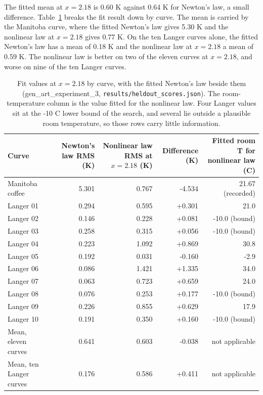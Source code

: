 \documentclass[11pt,letterpaper]{article}
\begin{document}
The fitted mean at $x = 2.18$ is 0.60 K against 0.64 K for Newton's law, a small difference. Table~\ref{tab:it2-fitcurve} breaks the fit result down by curve. The mean is carried by the Manitoba curve, where the fitted Newton's law gives 5.30 K and the nonlinear law at $x = 2.18$ gives 0.77 K. On the ten Langer curves alone, the fitted Newton's law has a mean of 0.18 K and the nonlinear law at $x = 2.18$ a mean of 0.59 K. The nonlinear law is better on two of the eleven curves at $x = 2.18$, and worse on nine of the ten Langer curves.

\begin{table}[!htbp]
\centering
\small
\caption{Fit values at $x = 2.18$ by curve, with the fitted Newton's law beside them (gen\_art\_experiment\_3, \texttt{results/heldout\_scores.json}). The room-temperature column is the value fitted for the nonlinear law. Four Langer values sit at the -10 C lower bound of the search, and several lie outside a plausible room temperature, so those rows carry little information.}
\label{tab:it2-fitcurve}
\begin{tabularx}{\linewidth}{Xrrrr}
\toprule
Curve & Newton's law RMS (K) & Nonlinear law RMS at $x = 2.18$ (K) & Difference (K) & Fitted room T for nonlinear law (C) \\
\midrule
Manitoba coffee & 5.301 & 0.767 & -4.534 & 21.67 (recorded) \\
Langer 01 & 0.294 & 0.595 & +0.301 & 21.0 \\
Langer 02 & 0.146 & 0.228 & +0.081 & -10.0 (bound) \\
Langer 03 & 0.258 & 0.315 & +0.056 & -10.0 (bound) \\
Langer 04 & 0.223 & 1.092 & +0.869 & 30.8 \\
Langer 05 & 0.192 & 0.031 & -0.160 & -2.9 \\
Langer 06 & 0.086 & 1.421 & +1.335 & 34.0 \\
Langer 07 & 0.063 & 0.723 & +0.659 & 24.0 \\
Langer 08 & 0.076 & 0.253 & +0.177 & -10.0 (bound) \\
Langer 09 & 0.226 & 0.855 & +0.629 & 17.9 \\
Langer 10 & 0.191 & 0.350 & +0.160 & -10.0 (bound) \\
Mean, eleven curves & 0.641 & 0.603 & -0.038 & not applicable \\
Mean, ten Langer curves & 0.176 & 0.586 & +0.411 & not applicable \\
\bottomrule
\end{tabularx}
\end{table}
\end{document}
